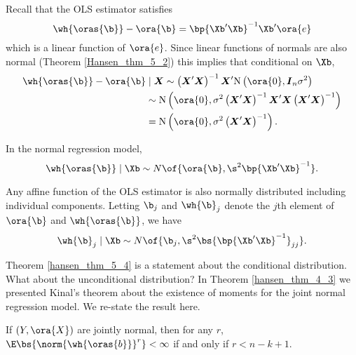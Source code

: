 Recall that the OLS estimator satisfies 
\begin{equation}
    \notag
    \wh{\oras{\b}} - \ora{\b} = \bp{\Xb^\prime \Xb}^{-1} \Xb^\prime \ora{e}
\end{equation}
which is a linear function of $\ora{e}$. Since linear functions of normals are also normal (Theorem \ref{Hansen_thm_5_2}) this implies that conditional on $\Xb$, 
\begin{equation}
    \notag
    \begin{aligned}
        \wh{\oras{\b}} - \ora{\b} & \mid \boldsymbol{X} \sim\left(\boldsymbol{X}^{\prime} \boldsymbol{X}\right)^{-1} \boldsymbol{X}^{\prime} \mathrm{N}\left(\ora{0}, \boldsymbol{I}_n \sigma^2\right) \\
        & \sim \mathrm{N}\left(\ora{0}, \sigma^2\left(\boldsymbol{X}^{\prime} \boldsymbol{X}\right)^{-1} \boldsymbol{X}^{\prime} \boldsymbol{X}\left(\boldsymbol{X}^{\prime} \boldsymbol{X}\right)^{-1}\right) \\
        & =\mathrm{N}\left(\ora{0}, \sigma^2\left(\boldsymbol{X}^{\prime} \boldsymbol{X}\right)^{-1}\right) .
    \end{aligned}
\end{equation}

\begin{theorem}
    \label{hansen_thm_5_4}
    In the normal regression model, 
    \begin{equation}
        \notag
        \wh{\oras{\b}} \mid \Xb \sim N\of{\ora{\b}, \s^2 \bp{\Xb^\prime \Xb}^{-1}}.
    \end{equation}
\end{theorem}

Any affine function of the OLS estimator is also normally distributed including individual components. Letting $\b_j$ and $\wh{\b}_j$ denote the $j$th element of $\ora{\b}$ and $\wh{\oras{\b}}$, we have 
\begin{equation}
    \label{hansen_eq_5_7}
    \wh{\b}_j \mid \Xb \sim N\of{\b_j, \s^2 \bs{\bp{\Xb^\prime \Xb}^{-1}}_{jj}}.
\end{equation}

Theorem \ref{hansen_thm_5_4} is a statement about the conditional distribution. What about the unconditional distribution? In Theorem \ref{hansen_thm_4_3} we presented Kinal's theorem about the existence of moments for the joint normal regression model. We re-state the result here. 

\begin{theorem}[Kinal (1980)] 
    
    If $(Y, \ora{X})$ are jointly normal, then for any $r$, $\E\bs{\norm{\wh{\oras{b}}}^r} < \infty$ if and only if $r < n - k + 1$.
\end{theorem}

